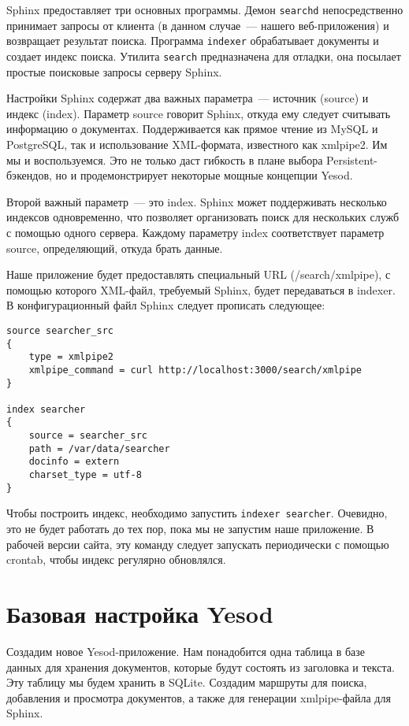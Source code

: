 Sphinx предоставляет три основных программы. Демон \lstinline!searchd! непосредственно принимает запросы от клиента (в данном случае~--- нашего веб-приложения) и возвращает результат поиска. Программа \lstinline!indexer! обрабатывает документы и создает индекс поиска. Утилита \lstinline!search! предназначена для отладки, она посылает простые поисковые запросы серверу Sphinx.

Настройки Sphinx содержат два важных параметра~--- источник (source) и индекс (index). Параметр source говорит Sphinx, откуда ему следует считывать информацию о документах. Поддерживается как прямое чтение из MySQL и PostgreSQL, так и использование XML-формата, известного как xmlpipe2. Им мы и воспользуемся. Это не только даст гибкость в плане выбора Persistent-бэкендов, но и продемонстрирует некоторые мощные концепции Yesod.

Второй важный параметр~--- это index. Sphinx может поддерживать несколько индексов одновременно, что позволяет организовать поиск для нескольких служб с помощью одного сервера. Каждому параметру index соответствует параметр source, определяющий, откуда брать данные.

Наше приложение будет предоставлять специальный URL (/search/xmlpipe), с помощью которого XML-файл, требуемый Sphinx, будет передаваться в indexer. В конфигурационный файл Sphinx следует прописать следующее:

\begin{lstlisting}
source searcher_src
{
    type = xmlpipe2
    xmlpipe_command = curl http://localhost:3000/search/xmlpipe
}

index searcher
{
    source = searcher_src
    path = /var/data/searcher
    docinfo = extern
    charset_type = utf-8
}
\end{lstlisting}

Чтобы построить индекс, необходимо запустить \lstinline!indexer searcher!. Очевидно, это не будет работать до тех пор, пока мы не запустим наше приложение.  В рабочей версии сайта, эту команду следует запускать периодически с помощью crontab, чтобы индекс регулярно обновлялся.

\section{Базовая настройка Yesod} %

Создадим новое Yesod-приложение. Нам понадобится одна таблица в базе данных для хранения документов, которые будут состоять из заголовка и текста. Эту таблицу мы будем хранить в SQLite. Создадим маршруты для поиска, добавления и просмотра документов, а также для генерации xmlpipe-файла для Sphinx.

